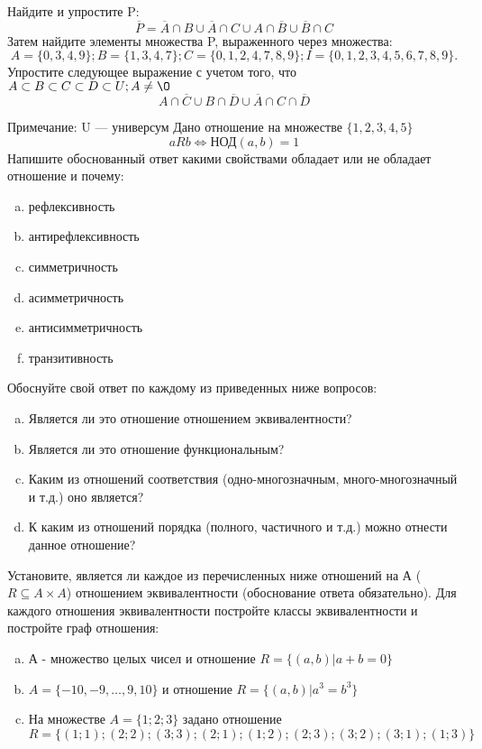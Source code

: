 \documentclass[10pt]{exam}
\begin{document}
\begin{questions}
\question
Найдите и упростите P:
\begin{equation*}
\overline{P} = \overline{A} \cap B \cup \overline{A} \cap C \cup A \cap \overline{B} \cup \overline{B} \cap C
\end{equation*}
Затем найдите элементы множества P, выраженного через множества:
\begin{equation*}
A = \{0, 3, 4, 9\}; 
B = \{1, 3, 4, 7\};
C = \{0, 1, 2, 4, 7, 8, 9\};
I = \{0, 1, 2, 3, 4, 5, 6, 7, 8, 9\}.
\end{equation*}\question
Упростите следующее выражение с учетом того, что $A\subset B \subset C \subset D \subset U; A \neq \O$
\begin{equation*}
A \cap  \overline{C} \cup B \cap \overline{D} \cup  \overline{A} \cap C \cap  \overline{D}
\end{equation*}

Примечание: U — универсум\question
Дано отношение на множестве $\{1, 2, 3, 4, 5\}$ 
\begin{equation*}
aRb \iff  \text{НОД}(a,b) =1
\end{equation*}
Напишите обоснованный ответ какими свойствами обладает или не обладает отношение и почему:   
\begin{enumerate} [a)]\setcounter{enumi}{0}
\item рефлексивность
\item антирефлексивность
\item симметричность
\item асимметричность
\item антисимметричность
\item транзитивность
\end{enumerate}

Обоснуйте свой ответ по каждому из приведенных ниже вопросов:
\begin{enumerate} [a)]\setcounter{enumi}{0}
    \item Является ли это отношение отношением эквивалентности?
    \item Является ли это отношение функциональным?
    \item Каким из отношений соответствия (одно-многозначным, много-многозначный и т.д.) оно является?
    \item К каким из отношений порядка (полного, частичного и т.д.) можно отнести данное отношение?
\end{enumerate}


\question
Установите, является ли каждое из перечисленных ниже отношений на А ($R \subseteq A \times A$) отношением эквивалентности (обоснование ответа обязательно). Для каждого отношения эквивалентности 
постройте классы эквивалентности и постройте граф отношения:
\begin{enumerate}[a)]\setcounter{enumi}{0}
\item А - множество целых чисел и отношение $R = \{(a,b)|a + b = 0\}$
\item $A = \{-10, -9, …, 9, 10\}$ и отношение $R = \{(a,b)|a^{3} = b^{3}\}$
\item На множестве $A = \{1; 2; 3\}$ задано отношение $R = \{(1; 1); (2; 2); (3; 3); (2; 1); (1; 2); (2; 3); (3; 2); (3; 1); (1; 3)\}$


\end{enumerate}
\end{questions}
\end{document}
